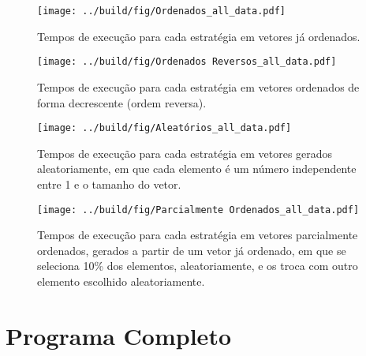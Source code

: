 \documentclass[10pt,oneside,onecolumn]{article}
\begin{document}
\begin{figure}[H]
	\centering
	\texttt{[image: ../build/fig/Ordenados\_all\_data.pdf]}
	\captionsetup{skip=0pt} %
	\caption{Tempos de execução para cada estratégia em vetores já ordenados.}
	\label{fig:ord}
\end{figure}

\begin{figure}[H]
	\centering
	\texttt{[image: ../build/fig/Ordenados Reversos\_all\_data.pdf]}
	\captionsetup{skip=0pt} %
	\caption{Tempos de execução para cada estratégia em vetores ordenados de
	forma decrescente (ordem reversa).}
	\label{fig:rev}
\end{figure}

\begin{figure}[H]
	\centering
	\texttt{[image: ../build/fig/Aleatórios\_all\_data.pdf]}
	\captionsetup{skip=0pt} %
	\caption{Tempos de execução para cada estratégia em vetores gerados
	aleatoriamente, em que cada elemento é um número independente entre 1 e o
	tamanho do vetor.}
	\label{fig:rand}
\end{figure}

\begin{figure}[H]
	\centering
	\texttt{[image: ../build/fig/Parcialmente Ordenados\_all\_data.pdf]}
	\captionsetup{skip=0pt} %
	\caption{Tempos de execução para cada estratégia em vetores parcialmente
	ordenados, gerados a partir de um vetor já ordenado, em que se seleciona
	10\% dos elementos, aleatoriamente, e os troca com outro elemento escolhido
	aleatoriamente.}
	\label{fig:part}
\end{figure}


\newpage
\appendix
\section{Programa Completo}\label{apx:codigo}

\newpage {}
\newpage {}
\newpage {}
\newpage {}

\end{document}
